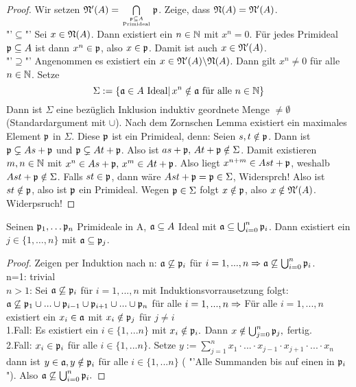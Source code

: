 \begin{proof}
	Wir setzen $\mathfrak{N}'(A)= \bigcap\limits_{\mathfrak{p} \subseteq A\atop \text{Primideal}} \mathfrak{p}$. Zeige, dass $\mathfrak{N}(A) = \mathfrak{N}'(A)$.\\
	"'$\subseteq$"' Sei $x\in \mathfrak{N}(A)$. Dann existiert ein $n\in \mathbb{N}$ mit $x^n=0$. Für jedes Primideal $\mathfrak{p}\subseteq A$ ist dann $x^n\in \mathfrak{p}$, also $x\in \mathfrak{p}$. Damit ist auch $x\in \mathfrak{N}'(A)$.\\
	"'$\supseteq$"' Angenommen es existiert ein $x\in \mathfrak{N}'(A) \backslash \mathfrak{N}(A)$. Dann gilt $x^n\neq 0$ für alle $n\in \mathbb{N}$. Setze
	$$\Sigma:= \{\mathfrak{a}\in A \text{ Ideal}|\, x^n\notin \mathfrak{a} \text{ für alle }n\in \mathbb{N}\}$$
	Dann ist $\Sigma$ eine bezüglich Inklusion induktiv geordnete Menge $\neq \emptyset$ (Standardargument mit $\cup$). Nach dem Zornschen Lemma existiert ein maximales Element $\mathfrak{p}$ in $\Sigma$. Diese $\mathfrak{p}$ ist ein Primideal, denn: Seien $s,t\notin \mathfrak{p}$. Dann ist $\mathfrak{p} \subsetneq As+ \mathfrak{p}$ und $\mathfrak{p}\subsetneq At+\mathfrak{p}$. Also ist $as+ \mathfrak{p}, \, At + \mathfrak{p} \notin\Sigma$. Damit existieren $m,n\in \mathbb{N}$ mit $x^n\in As+\mathfrak{p}, \, x^m \in At+ \mathfrak{p}$. Also liegt $x^{n+m} \in Ast+ \mathfrak{p}$, weshalb $Ast + \mathfrak{p} \notin\Sigma$. Falls $st \in \mathfrak{p}$, dann wäre $Ast + \mathfrak{p} = \mathfrak{p} \in \Sigma$, Widersprch! Also ist $st \notin \mathfrak{p}$, also ist $\mathfrak{p}$ ein Primideal. Wegen $\mathfrak{p} \in \Sigma$ folgt $x\notin \mathfrak{p}$, also $x\notin \mathfrak{N}'(A)$. Widerpsruch!
\end{proof}
\begin{bem} \label{11.6}
	Seinen $ \mathfrak{p}_1, \dots \mathfrak{p}_n $ Primideale in A, $\mathfrak{a} \subseteq A $ Ideal mit $\mathfrak{a} \subseteq \bigcup_{i = 0}^{n} \mathfrak{p}_i$. Dann existiert ein $j \in \{1,\dots,n \} $ mit $ \mathfrak{a} \subseteq \mathfrak{p}_j$.
\end{bem}
\begin{proof}
	Zeigen per Induktion nach n: $ \mathfrak{a} \not \subseteq \mathfrak{p}_i $ für $ i = 1,...,n  \Rightarrow \mathfrak{a} \not \subseteq \bigcup_{i = 0}^{n} \mathfrak{p}_i $. \\
	n=1: trivial\\
	$n>1$: Sei $\mathfrak{a} \not \subseteq \mathfrak{p}_i $ für $i = 1,...,n$ mit Induktionsvorrausetzung folgt: $\mathfrak{a} \not \subseteq \mathfrak{p}_1 \cup ... \cup \mathfrak{p}_{i-1} \cup \mathfrak{p}_{i+1} \cup ... \cup \mathfrak{p}_n $ für alle $i=1,...,n  \Rightarrow $ Für alle $ i = 1,...,n $ existiert ein $ x_i \in \mathfrak{a} $ mit $ x_i \notin \mathfrak{p}_j $ für $ j \neq i $ \\
	1.Fall: Es existiert ein $ i \in \{1,...n\} $ mit $ x_i \notin \mathfrak{p}_i.$ Dann $x \notin \bigcup_{j = 0}^{n} \mathfrak{p}_j, $ fertig. \\
	2.Fall: $x_i \in \mathfrak{p}_i $ für alle $i \in \{1,...n\} $. Setze $ y:= \sum_{j=1}^{n} x_1 \cdot ... \cdot x_{j-1} \cdot x_{j+1}  \cdot ... \cdot x_n$  dann ist $y \in \mathfrak{a}, y \notin \mathfrak{p}_i $ für  alle $i \in \{1,...n\} $ ( "'Alle Summanden bis auf einen in $\mathfrak{p}_i$"). Also $ \mathfrak{a} \not \subseteq \bigcup_{i = 0}^{n} \mathfrak{p}_i.$
\end{proof}
